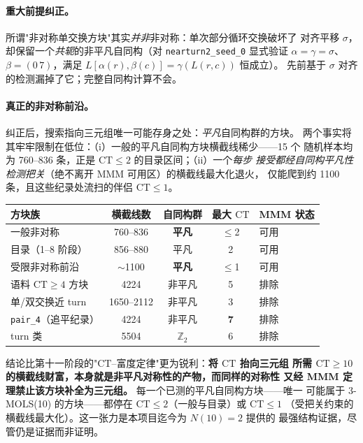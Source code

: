\documentclass[11pt,a4paper]{ctexart}
\theoremstyle{remark}
\newcommand{\CT}{\mathrm{CT}}
\begin{document}
\paragraph{重大前提纠正。}
所谓"非对称单交换方块"其实\emph{并非}非对称：单次部分循环交换破坏了
对齐平移 $\sigma$，却保留一个\emph{共轭}的非平凡自同构（对
\texttt{nearturn2\_seed\_0} 显式验证 $\alpha=\gamma=\sigma$、
$\beta=(0\,7)$，满足 $L[\alpha(r),\beta(c)]=\gamma(L(r,c))$ 恒成立）。
先前基于 $\sigma$ 对齐的检测漏掉了它；完整自同构计算不会。

\paragraph{真正的非对称前沿。}
纠正后，搜索指向三元组唯一可能存身之处：\emph{平凡}自同构群的方块。
两个事实将其牢牢限制在低位：（i）一般的平凡自同构方块横截线稀少——15 个
随机样本均为 760--836 条，正是 $\CT\leq2$ 的目录区间；（ii）一个\emph{每步
接受都经自同构平凡性检测把关}（绝不离开 MMM 可用区）的横截线最大化退火，
仅能爬到约 1100 条，且这些纪录处流扫的伴侣 $\CT\leq1$。

\begin{center}
\small
\begin{tabular}{lcccl}
\toprule
方块族 & 横截线数 & 自同构群 & 最大 $\CT$ & MMM 状态\\
\midrule
一般非对称 & 760--836 & \textbf{平凡} & $\leq$2 & 可用\\
目录（1--8 阶段） & 856--880 & 平凡 & 2 & 可用\\
受限非对称前沿 & $\sim$1100 & \textbf{平凡} & $\leq$1 & 可用\\
语料 $\CT\geq4$ 方块 & 4224 & 非平凡 & 5 & 排除\\
单/双交换近 turn & 1650--2112 & 非平凡 & 3 & 排除\\
\texttt{pair\_4}（追平纪录） & 4224 & 非平凡 & \textbf{7} & 排除\\
turn 类 & 5504 & $\mathbb{Z}_2$ & 6 & 排除\\
\bottomrule
\end{tabular}
\end{center}

结论比第十一阶段的"$\CT$--富度定律"更为锐利：\textbf{将 $\CT$ 抬向三元组
所需 $\CT\geq10$ 的横截线财富，本身就是非平凡对称性的产物，而同样的对称性
又经 MMM 定理禁止该方块补全为三元组。} 每一个已测的平凡自同构方块——唯一
可能属于 3-MOLS(10) 的方块——都停在 $\CT\leq2$（一般与目录）或 $\CT\leq1$
（受把关约束的横截线最大化）。这一张力是本项目迄今为 $N(10)=2$ 提供的
最强结构证据，尽管仍是证据而非证明。
\end{document}
